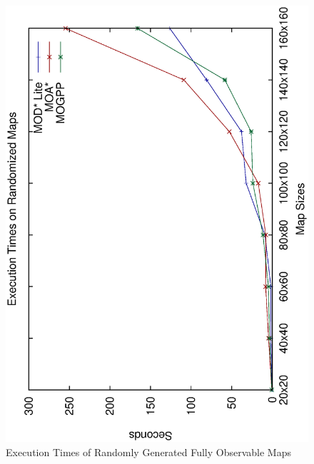 \documentclass[10pt,journal]{IEEEtran}
\begin{document}
\begin{figure}
\centering
\includegraphics[scale=0.3]{experimental/randomized_normal}
\caption{Execution Times of Randomly Generated Fully Observable Maps}
\label{fig:rand_fully}
\end{figure}
\end{document}
